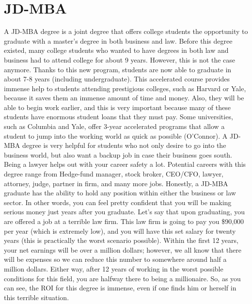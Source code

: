 \chapter{JD-MBA}
\begin{multicols}{2}

A JD-MBA degree is a joint degree that offers college students the opportunity to graduate with a master’s degree in both business and law. Before this degree existed, many college students who wanted to have degrees in both law and business had to attend college for about 9 years. However, this is not the case anymore. Thanks to this new program, students are now able to graduate in about 7-8 years (including undergraduate). This accelerated course provides immense help to students attending prestigious colleges, such as Harvard or Yale, because it saves them an immense amount of time and money. Also, they will be able to begin work earlier, and this is very important because many of these students have enormous student loans that they must pay.  Some universities, such as Columbia and Yale, offer 3-year accelerated programs that allow a student to jump into the working world as quick as possible (O’Connor). A JD-MBA degree is very helpful for students who not only desire to go into the business world, but also want a backup job in case their business goes south. Being a lawyer helps out with your career safety a lot. Potential careers with this degree range from Hedge-fund manager, stock broker, CEO/CFO, lawyer, attorney, judge, partner in firm, and many more jobs. Honestly, a JD-MBA graduate has the ability to hold any position within either the business or law sector. In other words, you can feel pretty confident that you will be making serious money just years after you graduate. Let's say that upon graduating, you are offered a job at a terrible law firm. This law firm is going to pay you \$90,000 per year (which is extremely low), and you will have this set salary for twenty years (this is practically the worst scenario possible). Within the first 12 years, your net earnings will be over a million dollars; however, we all know that there will be expenses so we can reduce this number to somewhere around half a million dollars. Either way, after 12 years of working in the worst possible conditions for this field, you are halfway there to being a millionaire. So, as you can see, the ROI for this degree is immense, even if one finds him or herself in this terrible situation.  


\end{multicols}
